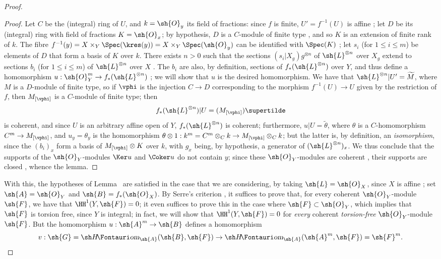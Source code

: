 \begin{proof}
  \begin{proof}
  Let $C$ be the (integral) ring of $U$, and $k=\sh{O}_y$ its field of fractions:
  since $f$ is finite, $U'=f^{-1}(U)$ is affine ;
  let $D$ be its (integral) ring with field of fractions $K=\sh{O}_x$;
  by hypothesis, $D$ is a $C$-module of finite type , and so $K$ is an extension of finite rank of $k$.
  The fibre $f^{-1}(y)=X\times_Y\Spec(\kres(y))=X\times_Y\Spec(\sh{O}_y)$ can be identified with $\Spec(K)$ ;
  let $s_i$ (for $1\leq i\leq m$) be elements of $D$ that form a basis of $K$ over $k$.
  There exists $n>0$ such that the sections $(s_i|X_g)g^{\otimes n}$ of $\sh{L}^{\otimes n}$ over $X_g$ extend to sections $b_i$ (for $1\leq i\leq m$) of $\sh{L}^{\otimes n}$ over $X$ .
  The $b_i$ are also, by definition, sections of $f_*(\sh{L}^{\otimes n})$ over $Y$, and thus define a homomorphism $u:\sh{O}_Y^m\to f_*(\sh{L}^{\otimes n})$ ;
  we will show that $u$ is the desired homomorphism.
  We have that $\sh{L}^{\otimes n}|U'=\widetilde{M}$, where $M$ is a $D$-module of finite type, so if $\vphi$ is the injection $C\to D$ corresponding to the morphism $f^{-1}(U)\to U$ given by the restriction of $f$, then $M_{[\vphi]}$ is a $C$-module of finite type;
  then
  \[
    f_*(\sh{L}^{\otimes n})|U = (M_{[\vphi]})\supertilde
  \]
   is coherent, and since $U$ is an arbitrary affine open of $Y$, $f_*(\sh{L}^{\otimes n})$ is coherent;
  furthermore, $u|U=\widetilde{\theta}$, where $\theta$ is a $C$-homomorphism $C^m\to M_{[\vphi]}$, and $u_y=\theta_y$ is the homomorphism $\theta\otimes1:k^m=C^m\otimes_C k\to M_{[\vphi]}\otimes_C k$;
  but the latter is, by definition, an \emph{isomorphism}, since the $(b_i)_x$ form a basis of $M_{[\vphi]}\otimes K$ over $k$, with $g_x$ being, by hypothesis, a generator of $(\sh{L}^{\otimes n})_x$.
  We thus conclude that the supports of the $\sh{O}_Y$-modules $\Ker u$ and $\Coker u$ do not contain $y$;
  since these $\sh{O}_Y$-modules are coherent , their supports are closed , whence the lemma.
  \end{proof}

With this, the hypotheses of Lemma~ are satisfied in the case that we are considering, by taking $\sh{L}=\sh{O}_X$, since $X$ is affine ;
set $\sh{A}=\sh{O}_Y$ and $\sh{B}=f_*(\sh{O}_X)$.
By Serre's criterion , it suffices to prove that, for every coherent $\sh{O}_Y$-module $\sh{F}$, we have that $\HH^1(Y,\sh{F})=0$;
it even suffices to prove this in the case where $\sh{F}\subset\sh{O}_Y$, which implies that $\sh{F}$ is torsion free, since $Y$ is integral;
in fact, we will show that $\HH^1(Y,\sh{F})=0$ for \emph{every} coherent \emph{torsion-free} $\sh{O}_Y$-module $\sh{F}$.
But the homomorphism $u:\sh{A}^m\to\sh{B}$ defines a homomorphism
\[
  v : \sh{G} = \shHom_{\sh{A}}(\sh{B},\sh{F}) \to \shHom_{\sh{A}}(\sh{A}^m,\sh{F}) = \sh{F}^m.
\]


\end{proof}
